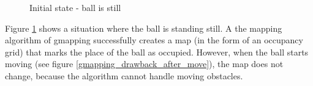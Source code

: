 \begin{figure}[!ht]
\centering
{}
\caption{Initial state - ball is still}
\label{gmapping_drawback_before_move}
\end{figure}

Figure \ref{gmapping_drawback_before_move} shows a situation where the ball is standing still. A the mapping algorithm of gmapping successfully creates a map (in the form of an occupancy grid) that marks the place of the ball as occupied. However, when the ball starts moving (see figure \ref{gmapping_drawback_after_move}), the map does not change, because the algorithm cannot handle moving obstacles.

